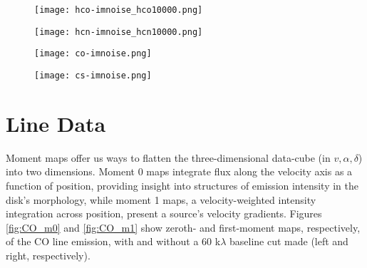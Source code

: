 \begin{figure}
  \centering
  \begin{minipage}{.48\textwidth}
    \centering
    \texttt{[image: hco-imnoise\_hco10000.png]}
    \label{fig:noise-profile_hco}
  \end{minipage}%
  \begin{minipage}{.48\textwidth}
    \centering
    \texttt{[image: hcn-imnoise\_hcn10000.png]}
    \label{fig:noise-profile_hcn}
  \end{minipage}%
  \par\medskip
  \begin{minipage}{.48\textwidth}
    \centering
    \texttt{[image: co-imnoise.png]}
    \label{fig:noise-profile_co}
  \end{minipage}%
  \begin{minipage}{.48\textwidth}
    \centering
    \texttt{[image: cs-imnoise.png]}
    \label{fig:noise-profile_cs}
  \end{minipage}
  \label{fig:noise-profiles}
\end{figure}





\section{Line Data}
\label{section:line_data}

Moment maps offer us ways to flatten the three-dimensional data-cube (in $v, \alpha, \delta$) into two dimensions. Moment 0 maps integrate flux along the velocity axis as a function of position, providing insight into structures of emission intensity in the disk's morphology, while moment 1 maps, a velocity-weighted intensity integration across position, present a source's velocity gradients. Figures \ref{fig:CO_m0} and \ref{fig:CO_m1} show zeroth- and first-moment maps, respectively, of the CO line emission, with and without a 60 k$\lambda$ baseline cut made (left and right, respectively).


